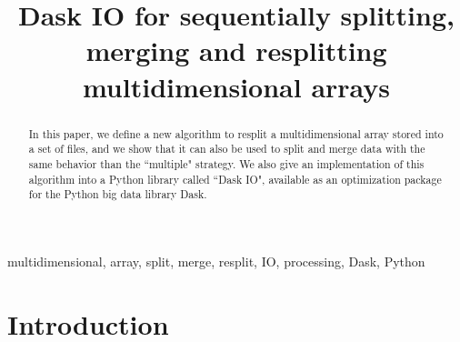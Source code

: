 \documentclass[conference]{IEEEtran}
\begin{document}
\title{ Dask IO for sequentially splitting, merging and resplitting multidimensional arrays }

\author{
\and
{}
\and
{}
}

\maketitle

\begin{abstract}
In this paper, we define a new algorithm to resplit a multidimensional array stored into a set of files, and we show that it can also be used to split and merge data with the same behavior than the ``multiple" strategy. We also give an implementation of this algorithm into a Python library called ``Dask IO", available as an optimization package for the Python big data library Dask.
\end{abstract}

\begin{IEEEkeywords}
multidimensional, array, split, merge, resplit, IO, processing, Dask, Python
\end{IEEEkeywords}

\section*{Introduction}
\end{document}

